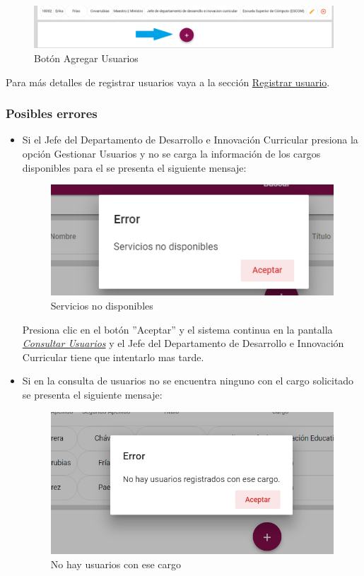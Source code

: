 \begin{figure}[H]
	\centering
	\hypertarget{add-JDDIC}{\includegraphics[width=0.7\linewidth]{images/SP5/BtnAgregar}}
	\caption{Botón Agregar Usuarios}
	\label{add-JDDIC}
\end{figure}

Para más detalles de registrar usuarios vaya a la sección \hyperlink{registrar-Us-JDDIC}{Registrar usuario}.

\subsubsection{Posibles errores}
\begin{itemize}
	\item Si el Jefe del Departamento de Desarrollo e Innovación Curricular  presiona la opción Gestionar Usuarios y no se carga la información de los cargos disponibles para el se presenta el siguiente mensaje:
	
	\begin{figure}[H]
		\centering
		\includegraphics[width=0.4\linewidth]{images/SP5/MSGSN}
		\caption{Servicios no disponibles}
		\label{SND-JDDIC}
		
	\end{figure}
	
	Presiona clic en el botón ''Aceptar'' y  el sistema continua en la pantalla  \hyperlink{consultarUs-JDDIC}{\textit{Consultar Usuarios}} y el Jefe del Departamento de Desarrollo e Innovación Curricular tiene que intentarlo  mas tarde.
	
	\item Si en la consulta de usuarios no se encuentra ninguno con el cargo solicitado se presenta el siguiente mensaje:
	\begin{figure}[H]
		\centering
		\includegraphics[width=0.4\linewidth]{images/SP5/MSG21}
		\caption{No hay usuarios con ese cargo}
		\label{mensaje21-JDDIC}
	\end{figure}
	
\end{itemize}

